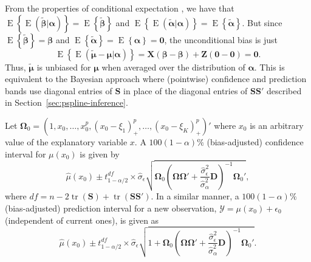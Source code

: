 \documentclass[cmfont,usenames,dvipsnames,leqno]{afit-etd}\usepackage[]{graphicx}\usepackage[]{color}
\newcommand{\mc}[1]{\ensuremath{\mathcal{#1}}}
\newcommand{\wh}[1]{\ensuremath{\widehat{#1}}}
\newcommand{\wt}[1]{\ensuremath{\widetilde{#1}}}
\newcommand{\E}{\operatorname{E}}
\newcommand{\tr}{\operatorname{tr}}
\begin{document}
From the properties of conditional expectation \citep[pg. 164]{casella_statistical_2002}, we have that $\E\left\{\E\left(\wt{\bm{\beta}}|\bm{\alpha}\right)\right\} = \E\left\{\wt{\bm{\beta}}\right\}$ and $\E\left\{\E\left(\wt{\bm{\alpha}}|\bm{\alpha}\right)\right\} = \E\left\{\wt{\bm{\alpha}}\right\}$. But since $\E\left\{\wt{\bm{\beta}}\right\} = \bm{\beta}$ and $\E\left\{\wt{\bm{\alpha}}\right\} = \E\left\{\bm{\alpha}\right\} = \bm{0}$, the unconditional bias is just 
\begin{equation*}
  \E\left\{\E\left(\wt{\bm{\mu}} - \bm{\mu}|\bm{\alpha}\right)\right\} = \bm{X}\left(\bm{\beta} - \bm{\beta}\right) + \bm{Z}\left(\bm{0} - \bm{0}\right) = \bm{0}. 
\end{equation*}
Thus, $\wt{\bm{\mu}}$ is unbiased for $\bm{\mu}$ when averaged over the distribution of $\bm{\alpha}$. This is equivalent to the Bayesian approach where (pointwise) confidence and prediction bands use diagonal entries of $\bm{S}$ in place of the diagonal entries of $\bm{S}\bm{S}'$ described in Section~\ref{sec:pspline-inference}.

Let $\bm{\Omega}_0 = \left(1, x_0, \dotsc, x_0^p, (x_0 - \xi_1)_+^p, \dotsc, (x_0 - \xi_K)_+^p\right)'$ where $x_0$ is an arbitrary value of the explanatory variable $x$. A $100(1 - \alpha)\%$ (bias-adjusted) confidence interval for $\mu(x_0)$ is given by
\begin{equation*}
  \wh{\mu}(x_0) \pm t_{1-\alpha/2}^{df} \times \wh{\sigma}_\epsilon\sqrt{\bm{\Omega}_0\left(\bm{\Omega}\bm{\Omega}' + \frac{\wh{\sigma}_\epsilon^2}{\wh{\sigma}_\alpha^2}\bm{D} \right)^{-1}\bm{\Omega}_0'},
\end{equation*}
where $df = n - 2\tr\left(\bm{S}\right) + \tr\left(\bm{S}\bm{S}'\right)$. In a similar manner, a $100(1 - \alpha)\%$ (bias-adjusted) prediction interval for a new observation, $\mc{Y} = \mu(x_0) + \epsilon_0$ (independent of current ones), is given as
\begin{equation}
\label{eqn:bias-adjusted-pi}
  \wh{\mu}(x_0) \pm t_{1-\alpha/2}^{df} \times \wh{\sigma}_\epsilon\sqrt{1 + \bm{\Omega}_0\left(\bm{\Omega}\bm{\Omega}' + \frac{\wh{\sigma}_\epsilon^2}{\wh{\sigma}_\alpha^2}\bm{D} \right)^{-1}\bm{\Omega}_0'}.
\end{equation}
\end{document}
